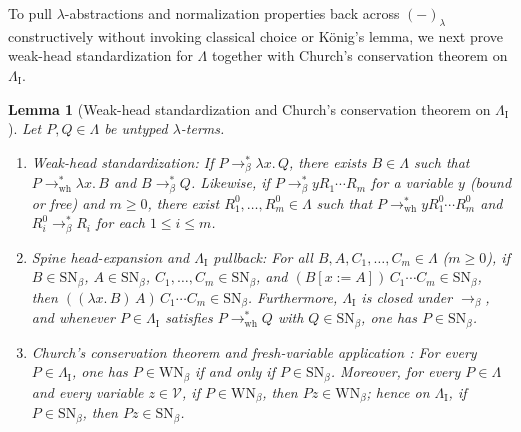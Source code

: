\documentclass[11pt,reqno]{amsart}
\numberwithin{equation}{section}
\theoremstyle{plain}
\newtheorem{lemma}[theorem]{Lemma}
\theoremstyle{definition}
\theoremstyle{remark}
\newcommand{\SN}{\mathrm{SN}}
\newcommand{\WN}{\mathrm{WN}}
\begin{document}
To pull $\lambda$-abstractions and normalization properties back across $(-)_\lambda$ constructively without invoking classical choice or K\"onig's lemma, we next prove weak-head standardization for $\Lambda$ together with Church's conservation theorem on $\Lambda_{\mathrm{I}}$.

\begin{lemma}[Weak-head standardization and Church's conservation theorem on $\Lambda_{\mathrm{I}}$]\label{lem:lambdaI-conservation}
Let $P, Q \in \Lambda$ be untyped $\lambda$-terms.
\begin{enumerate}[label=(\roman*),leftmargin=2.2em]
  \item \emph{Weak-head standardization:} If $P \to_\beta^* \lambda x.\, Q$, there exists $B \in \Lambda$ such that $P \to_{\mathrm{wh}}^* \lambda x.\, B$ and $B \to_\beta^* Q$. Likewise, if $P \to_\beta^* y R_1 \cdots R_m$ for a variable $y$ (bound or free) and $m \ge 0$, there exist $R_1^0, \dots, R_m^0 \in \Lambda$ such that $P \to_{\mathrm{wh}}^* y R_1^0 \cdots R_m^0$ and $R_i^0 \to_\beta^* R_i$ for each $1 \le i \le m$.
  \item \emph{Spine head-expansion and $\Lambda_{\mathrm{I}}$ pullback:} For all $B, A, C_1, \dots, C_m \in \Lambda$ ($m \ge 0$), if $B \in \SN_\beta$, $A \in \SN_\beta$, $C_1, \dots, C_m \in \SN_\beta$, and $(B[x := A])\,C_1 \cdots C_m \in \SN_\beta$, then $((\lambda x.\, B)\,A)\,C_1 \cdots C_m \in \SN_\beta$. Furthermore, $\Lambda_{\mathrm{I}}$ is closed under $\to_\beta$, and whenever $P \in \Lambda_{\mathrm{I}}$ satisfies $P \to_{\mathrm{wh}}^* Q$ with $Q \in \SN_\beta$, one has $P \in \SN_\beta$.
  \item \emph{Church's conservation theorem and fresh-variable application \cite{Church1941,Barendregt1984}:} For every $P \in \Lambda_{\mathrm{I}}$, one has $P \in \WN_\beta$ if and only if $P \in \SN_\beta$. Moreover, for every $P \in \Lambda$ and every variable $z \in \mathcal{V}$, if $P \in \WN_\beta$, then $P z \in \WN_\beta$; hence on $\Lambda_{\mathrm{I}}$, if $P \in \SN_\beta$, then $P z \in \SN_\beta$.
\end{enumerate}
\end{lemma}
\end{document}

